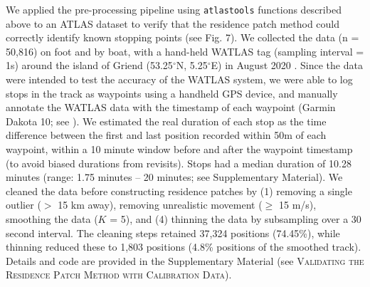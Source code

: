 \begin{refsection}
    We applied the pre-processing pipeline using \texttt{atlastools} functions described above to an ATLAS dataset to verify that the residence patch method could correctly identify known stopping points (see Fig. 7).
    We collected the data (n = 50,816) on foot and by boat, with a hand-held WATLAS tag (sampling interval = 1s) around the island of Griend (53.25$^{\circ}$N, 5.25$^{\circ}$E) in August 2020 \citep[WATLAS: Wadden Sea ATLAS system][Bijleveld et al. \textit{in prep.}]{beardsworth2021}.
    Since the data were intended to test the accuracy of the WATLAS system, we were able to log stops in the track as waypoints using a handheld GPS device, and manually annotate the WATLAS data with the timestamp of each waypoint (Garmin Dakota 10; see \citealt{beardsworth2021}).
    We estimated the real duration of each stop as the time difference between the first and last position recorded within 50m of each waypoint, within a 10 minute window before and after the waypoint timestamp (to avoid biased durations from revisits).
    Stops had a median duration of 10.28 minutes (range: 1.75 minutes -- 20 minutes; see Supplementary Material).
    We cleaned the data before constructing residence patches by (1) removing a single outlier ($>$ 15 km away), removing unrealistic movement ($\geq$ 15 m/s), smoothing the data ($K$ = 5), and (4) thinning the data by subsampling over a 30 second interval.
    The cleaning steps retained 37,324 positions (74.45\%), while thinning reduced these to 1,803 positions (4.8\% positions of the smoothed track).
    Details and code are provided in the Supplementary Material (see \textsc{Validating the Residence Patch Method with Calibration Data}).



\end{refsection}
